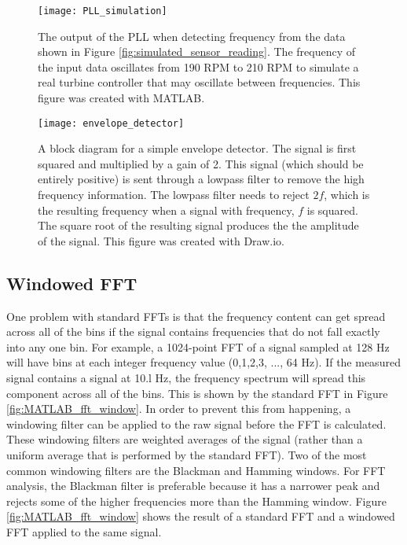 \begin{figure}
	\centering
	\texttt{[image: PLL\_simulation]}
	\decoRule
	\caption{The output of the PLL  when detecting frequency from the data shown in Figure \ref{fig:simulated_sensor_reading}.  The frequency of the input data oscillates from 190 RPM to 210 RPM to simulate a real turbine controller that may oscillate between frequencies.  This figure was created with MATLAB.}
	\label{fig:PLL_simulation}
\end{figure}

\begin{figure}
	\centering
	\texttt{[image: envelope\_detector]}
	\decoRule
	\caption{A block diagram for a simple envelope detector.  The signal is first squared and multiplied by a gain of 2.  This signal (which should be entirely positive) is sent through a lowpass filter to remove the high frequency information.  The lowpass filter needs to reject $2f$, which is the resulting frequency when a signal with frequency, $f$ is squared.  The square root of the resulting signal produces the the amplitude of the signal.  This figure was created with Draw.io.}
	\label{fig:envelope_detector}
\end{figure}

\subsection{Windowed FFT}
One problem with standard FFTs is that the frequency content can get spread across all of the bins if the signal contains frequencies that do not fall exactly into any one bin.  For example, a 1024-point FFT of a signal sampled at 128 Hz will have bins at each integer frequency value (0,1,2,3, ..., 64 Hz).  If the measured signal contains a signal at 10.l Hz, the frequency spectrum will spread this component across all of the bins.  This is shown by the standard FFT in Figure \ref{fig:MATLAB_fft_window}.  In order to prevent this from happening, a windowing filter can be applied to the raw signal before the FFT is calculated.  These windowing filters are weighted averages of the signal (rather than a uniform average that is performed by the standard FFT).  Two of the most common windowing filters are the Blackman and Hamming windows.  For FFT analysis, the Blackman filter is preferable because it has a narrower peak and rejects some of the higher frequencies more than the Hamming window.  Figure \ref{fig:MATLAB_fft_window} shows the result of a standard FFT and a windowed FFT applied to the same signal.

